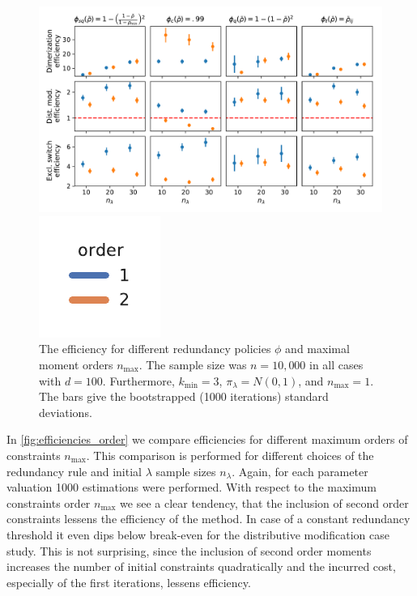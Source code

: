 \begin{figure}[t]
    \centering    
    \begin{minipage}{.9\textwidth}
    \centering
    \includegraphics[scale=.4]{gfx/efficiency_ord1.pdf}
    \end{minipage}\hspace{-1em}
    \begin{minipage}{0.09\textwidth}
    \centering
    \includegraphics[scale=.55]{gfx/legend_orders.pdf}
    \end{minipage}
	\caption[Influence of the redundancy heuristic
	and moment orders]{The efficiency for different redundancy policies $\phi$ and maximal 
    moment orders $n_{\max}$. The sample size was $n=10,\!000$ in all cases
    with $d=100$. Furthermore, $k_{\min}=3$, $\pi_\lambda=N(0,1)$, and $n_{\max}=1$.
    The bars give the 
    bootstrapped (1000 iterations) standard deviations.\label{fig:efficiencies_order}}
\end{figure}

In \autoref{fig:efficiencies_order} we compare efficiencies for
different maximum orders of constraints $n_{\max}$.
This comparison is performed for different choices
of the redundancy rule and initial $\lambda$ sample sizes $n_{\lambda}$.
Again, for each parameter valuation 1000 estimations were performed.
With respect to the maximum constraints order $n_{\max}$ we see a clear
tendency, that the inclusion of second order
constraints lessens the efficiency of the method.
In case of a constant redundancy threshold it even dips below break-even
for the distributive modification case study.
This is not surprising, since the inclusion of second order moments
increases the number of initial constraints quadratically
and the incurred cost, especially of the first iterations,
lessens efficiency.


